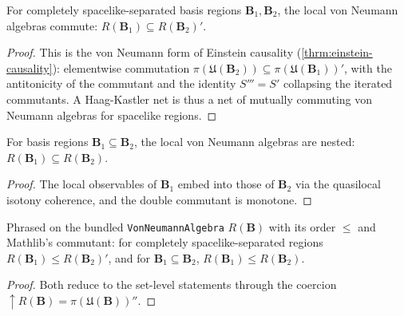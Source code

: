 \begin{theorem}
    \label{thrm:von-neumann-microcausality}
    \leanok
    For completely spacelike-separated basis regions $\mathbf{B}_1, \mathbf{B}_2$, the local von Neumann algebras commute: $R(\mathbf{B}_1) \subseteq R(\mathbf{B}_2)'$.
\end{theorem}
\begin{proof}
    \leanok
    This is the von Neumann form of Einstein causality (\ref{thrm:einstein-causality}): elementwise commutation $\pi(\mathfrak{U}(\mathbf{B}_2)) \subseteq \pi(\mathfrak{U}(\mathbf{B}_1))'$, with the antitonicity of the commutant and the identity $S''' = S'$ collapsing the iterated commutants. A Haag-Kastler net is thus a net of mutually commuting von Neumann algebras for spacelike regions.
\end{proof}

\begin{theorem}
    \label{thrm:von-neumann-isotony}
    \leanok
    For basis regions $\mathbf{B}_1 \subseteq \mathbf{B}_2$, the local von Neumann algebras are nested: $R(\mathbf{B}_1) \subseteq R(\mathbf{B}_2)$.
\end{theorem}
\begin{proof}
    \leanok
    The local observables of $\mathbf{B}_1$ embed into those of $\mathbf{B}_2$ via the quasilocal isotony coherence, and the double commutant is monotone.
\end{proof}

\begin{theorem}
    \label{thrm:von-neumann-bundled-order}
    \leanok
    Phrased on the bundled \texttt{VonNeumannAlgebra} $R(\mathbf{B})$ with its order $\le$ and Mathlib's commutant: for completely spacelike-separated regions $R(\mathbf{B}_1) \le R(\mathbf{B}_2)'$, and for $\mathbf{B}_1 \subseteq \mathbf{B}_2$, $R(\mathbf{B}_1) \le R(\mathbf{B}_2)$.
\end{theorem}
\begin{proof}
    \leanok
    Both reduce to the set-level statements through the coercion $\uparrow R(\mathbf{B}) = \pi(\mathfrak{U}(\mathbf{B}))''$.
\end{proof}

